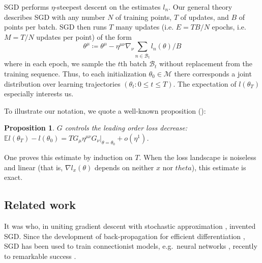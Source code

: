 \documentclass[final,12pt]{colt2021} %
\newtheorem*{prop*}{Proposition}
\newcommand{\expc}{\mathbb{E}}
\newcommand{\Bb}{\mathcal{B}}
\newcommand{\Mm}{\mathcal{M}}
\begin{document}

            SGD performs $\eta$-steepest descent on the estimates $l_n$.  Our
            general theory describes SGD with any number
                 $N$ of training points,
                 $T$ of updates, and 
                 $B$ of points per batch.
            SGD then runs $T$ many updates (i.e. $E=TB/N$ epochs, i.e. $M=T/N$
            updates per point) of the form
            $$
                \textstyle
                \theta^\mu
                \coloneqq
                \theta^\mu -
                \eta^{\mu\nu} \nabla_\nu
                    \sum_{n\in \Bb_t} l_n(\theta) / B
            $$
            where in each epoch, we sample the $t$th batch $\Bb_t$ without
            replacement from the training sequence.  Thus, to each
            initialization $\theta_0 \in \Mm$ there corresponds a joint
            distribution over learning trajectories $(\theta_t: 0\leq t \leq
            T)$.  The expectation of $l(\theta_T)$ especially interests us.
 

            To illustrate our notation, we quote a well-known proposition
            (\cite{ne04}):
            \begin{prop*}
                $G$ controls the leading order loss decrease:
                $
                    \expc l(\theta_T) - l(\theta_0) =
                    T G_{\mu} \eta^{\mu\nu} G_\nu|_{\theta=\theta_0}
                    + o(\eta^1)
                $.
            \end{prop*}
            One proves this estimate by induction on $T$.  When the loss
            landscape is noiseless and linear (that is, $\nabla l_x(\theta)$
            depends on neither $x$ nor $theta$), this estimate is exact.

        \newpage
        \subsection{Related work}
    

            It was \cite{ki52} who, in uniting gradient descent \citep{ca47}
            with stochastic approximation \citep{ro51}, invented SGD.  Since
            the development of back-propagation for efficient differentiation
            \citep{we74}, SGD has been used to train connectionist models,
            e.g.\ neural networks \citep{bo91}, recently to remarkable success
            \citep{le15}.
        
\end{document}
